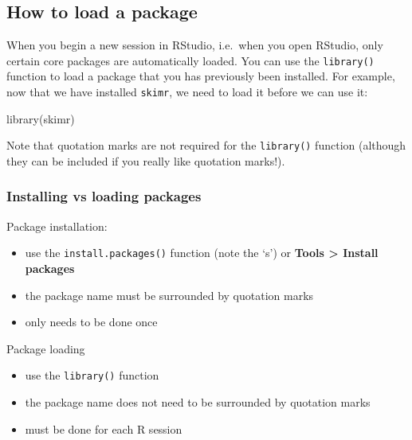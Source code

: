 \documentclass[
]{memoir}
\newenvironment{Shaded}{\begin{snugshade}}{\end{snugshade}}
\newcommand{\FunctionTok}[1]{\textcolor[rgb]{0.00,0.00,0.00}{#1}}
\newcommand{\NormalTok}[1]{#1}
\providecommand{\tightlist}{%
  \setlength{\itemsep}{0pt}\setlength{\parskip}{0pt}}
\begin{document}
\hypertarget{how-to-load-a-package}{%
\subsection{How to load a package}\label{how-to-load-a-package}}

When you begin a new session in RStudio, i.e.~when you open RStudio, only certain core packages are automatically loaded. You can use the \texttt{library()} function to load a package that you has previously been installed. For example, now that we have installed \texttt{skimr}, we need to load it before we can use it:

\begin{Shaded}
\begin{Highlighting}[]
\FunctionTok{library}\NormalTok{(skimr)}
\end{Highlighting}
\end{Shaded}

Note that quotation marks are not required for the \texttt{library()} function (although they can be included if you really like quotation marks!).

\hypertarget{installing-vs-loading-packages}{%
\subsubsection*{Installing vs loading packages}\label{installing-vs-loading-packages}}

Package installation:

\begin{itemize}
\tightlist
\item
  use the \texttt{install.packages()} function (note the `s') or \textbf{Tools \textgreater{} Install packages}
\item
  the package name must be surrounded by quotation marks
\item
  only needs to be done once
\end{itemize}

Package loading

\begin{itemize}
\tightlist
\item
  use the \texttt{library()} function
\item
  the package name does not need to be surrounded by quotation marks
\item
  must be done for each R session
\end{itemize}
\end{document}
